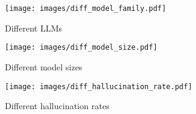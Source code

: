 \begin{figure*}[t]
    \hfill
    \begin{subfigure}{0.35\textwidth}
    \texttt{[image: images/diff\_model\_family.pdf]}
    \caption{Different LLMs}\label{fig:eval_model_family}
    \end{subfigure}
    \hfill
    \begin{subfigure}{0.34\textwidth}
    \texttt{[image: images/diff\_model\_size.pdf]}
    \caption{Different model sizes}\label{fig:eval_model_size}
    \end{subfigure}
    \hfill
    \begin{subfigure}{0.29\textwidth}
    \texttt{[image: images/diff\_hallucination\_rate.pdf]}
    \caption{Different hallucination rates}\label{fig:eval_hallucination_rate}
    \end{subfigure}
    \hfill
     \vspace{-.5pc}
    \caption{
    For each method, we show performance variation across 17 LLMs (\ref{fig:eval_model_family}). We also show AUPRC scores across LLMs with different capacities (\ref{fig:eval_model_size}), as well as performance on data with different hallucination rates (\ref{fig:eval_hallucination_rate}). Note that the model used in Figure~\ref{fig:eval_hallucination_rate} is Llama3-8B.
    }
    \label{fig:experimental_result}
    \vspace{-1pc}
\end{figure*}